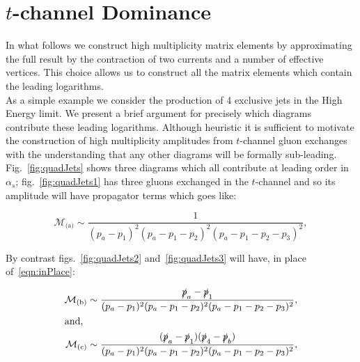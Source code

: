 \section{$t$-channel Dominance}
	\label{sec:tChannel}

	In what follows we construct high multiplicity matrix elements by approximating the full result
	by the contraction of two currents and a number of effective vertices.  This choice allows us
	to construct all the matrix elements which contain the leading logarithms.\\
	As a simple example we consider the production of 4 exclusive jets in the High Energy limit.
	We present a brief argument for precisely which diagrams contribute these leading logarithms.
	Although heuristic it is sufficient to motivate the construction of high multiplicity amplitudes from
	$t$-channel gluon exchanges with the understanding that any other diagrams will be formally sub-leading.
	Fig.~\eqref{fig:quadJets} shows three diagrams which all contribute at leading order in $\alpha_s$;
	fig.~\eqref{fig:quadJets1} has three gluons exchanged in the $t$-channel and so its amplitude will
	have propagator terms which goes like:

	\begin{equation}
		\mathcal{M}_{\text{(a)}}\sim\frac{1}{(p_a - p_1)^2(p_a - p_1 - p_2)^2(p_a - p_1 - p_2 - p_3)^2},
		\label{eqn:inPlace}
	\end{equation}

	By contrast figs.~\eqref{fig:quadJets2} and~\eqref{fig:quadJets3} will
	have, in place of~\eqref{eqn:inPlace}:

	\begin{align}
		\mathcal{M}_{\text{(b)}}\sim\frac{\slashed p_a - \slashed p_1}
		{(p_a - p_1)^2(p_a - p_1 - p_2)^2(p_a - p_1 - p_2 - p_3)^2},\\
		\intertext{and,}
		\mathcal{M}_{\text{(c)}}\sim\frac{(\slashed p_a - \slashed p_1)(\slashed p_4 - \slashed p_b)}
		{(p_a - p_1)^2(p_a - p_1 - p_2)^2(p_a - p_1 - p_2 - p_3)^2},
	\end{align}

